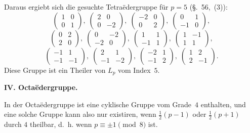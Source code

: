 \documentclass[12pt,a4paper]{article}
\begin{document}
\newpage
{}

Daraus ergiebt sich die gesuchte Tetraëdergruppe für $p = 5$ (\S.~56,~(3)):
\[
\begin{pmatrix}1&0\\0&1\end{pmatrix},\;
\begin{pmatrix}2&0\\0&-2\end{pmatrix},\;
\begin{pmatrix}-2&0\\0&2\end{pmatrix},\;
\begin{pmatrix}0&1\\-1&0\end{pmatrix},
\]
\[
\begin{pmatrix}0&2\\2&0\end{pmatrix},\;
\begin{pmatrix}0&-2\\-2&0\end{pmatrix},\;
\begin{pmatrix}1&1\\-1&1\end{pmatrix},\;
\begin{pmatrix}1&-1\\1&1\end{pmatrix},
\]
\[
\begin{pmatrix}-1&1\\-1&-1\end{pmatrix},\;
\begin{pmatrix}2&1\\-1&-2\end{pmatrix},\;
\begin{pmatrix}-2&1\\-1&2\end{pmatrix},\;
\begin{pmatrix}1&2\\2&-1\end{pmatrix}.
\]
Diese Gruppe ist ein Theiler von $L_{p}$ vom Index~$5$.

\medskip\noindent
\textbf{IV. Octaëdergruppe.}

In der Octaëdergruppe ist eine cyklische Gruppe vom Grade~$4$ enthalten, und eine solche Gruppe kann also nur existiren, wenn $\frac{1}{2}(p-1)$ oder $\frac{1}{2}(p+1)$ durch $4$ theilbar, d.~h. wenn $p \equiv \pm 1 \pmod{8}$ ist.
\end{document}
